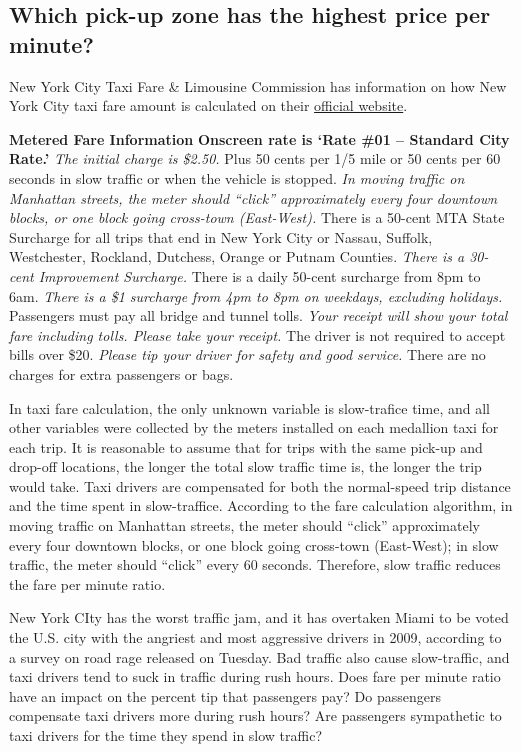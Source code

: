 \documentclass[12pt,twoside]{reedthesis}
\theoremstyle{definition}
\theoremstyle{definition}
\theoremstyle{definition}
\theoremstyle{remark}
\begin{document}
\subsection{Which pick-up zone has the highest price per
minute?}\label{which-pick-up-zone-has-the-highest-price-per-minute}

New York City Taxi Fare \& Limousine Commission has information on how
New York City taxi fare amount is calculated on their
\href{http://www.nyc.gov/html/tlc/html/passenger/taxicab_rate.shtml}{official
website}.

\textbf{Metered Fare Information} \textbf{Onscreen rate is `Rate \#01 --
Standard City Rate.'} \emph{The initial charge is \$2.50. }Plus 50 cents
per 1/5 mile or 50 cents per 60 seconds in slow traffic or when the
vehicle is stopped. \emph{In moving traffic on Manhattan streets, the
meter should ``click'' approximately every four downtown blocks, or one
block going cross-town (East-West). }There is a 50-cent MTA State
Surcharge for all trips that end in New York City or Nassau, Suffolk,
Westchester, Rockland, Dutchess, Orange or Putnam Counties. \emph{There
is a 30-cent Improvement Surcharge. }There is a daily 50-cent surcharge
from 8pm to 6am. \emph{There is a \$1 surcharge from 4pm to 8pm on
weekdays, excluding holidays. }Passengers must pay all bridge and tunnel
tolls. \emph{Your receipt will show your total fare including tolls.
Please take your receipt. }The driver is not required to accept bills
over \$20. \emph{Please tip your driver for safety and good service.
}There are no charges for extra passengers or bags.

In taxi fare calculation, the only unknown variable is slow-trafice
time, and all other variables were collected by the meters installed on
each medallion taxi for each trip. It is reasonable to assume that for
trips with the same pick-up and drop-off locations, the longer the total
slow traffic time is, the longer the trip would take. Taxi drivers are
compensated for both the normal-speed trip distance and the time spent
in slow-traffice. According to the fare calculation algorithm, in moving
traffic on Manhattan streets, the meter should ``click'' approximately
every four downtown blocks, or one block going cross-town (East-West);
in slow traffic, the meter should ``click'' every 60 seconds. Therefore,
slow traffic reduces the fare per minute ratio.

New York CIty has the worst traffic jam, and it has overtaken Miami to
be voted the U.S. city with the angriest and most aggressive drivers in
2009, according to a survey on road rage released on Tuesday. Bad
traffic also cause slow-traffic, and taxi drivers tend to suck in
traffic during rush hours. Does fare per minute ratio have an impact on
the percent tip that passengers pay? Do passengers compensate taxi
drivers more during rush hours? Are passengers sympathetic to taxi
drivers for the time they spend in slow traffic?
\end{document}
